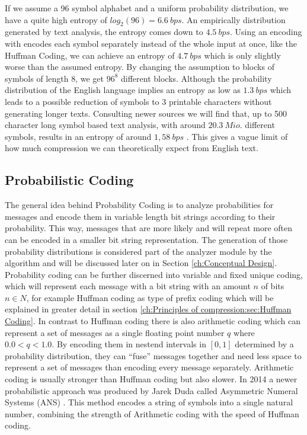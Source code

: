 \par {
If we assume a 96 symbol alphabet and a uniform probability distribution, we have a quite high entropy of $log_2 (96) = 6.6 \: bps$. An empirically distribution generated by text analysis, the entropy comes down to $4.5 \: bps$. Using an encoding with 
encodes each symbol separately instead of the whole input at once, like the Huffman Coding, we can achieve an entropy of $4.7 \: bps$ which is only slightly worse than the assumed entropy. By changing the assumption to blocks of symbols of length 8, we get $96^8$ different blocks. Although the probability distribution of the English language implies an entropy as low as $1.3 \: bps$ which leads to a possible reduction of symbols to 3 printable characters without generating longer texts. Consulting newer sources we will find that, up to 500 character long symbol based text analysis, with around $20.3 \: Mio.$ different symbols, results in an entropy of around $1,58 \: bps$ \cite{entropy-new}. This gives a vague limit of how much compression we can theoretically expect from English text.}


\subsection{Probabilistic Coding}
\par{
The general idea behind Probability Coding is to analyze probabilities for messages and encode them in variable length bit strings according to their probability. This way, messages that are more likely and will repeat more often can be encoded in a smaller bit string representation. The generation of those probability distributions is considered part of the analyzer module by the algorithm and will be discussed later on in Section \ref{ch:Conceptual Design}. Probability coding can be further discerned into variable and fixed unique coding, which will represent each message with a bit string with an amount $n$ of bits $n \in N$, for example Huffman coding as type of prefix coding which will be explained in greater detail in section \ref{ch:Principles of compression:sec:Huffman Coding}. In contrast to Huffman coding there is also arithmetic coding which can represent a set of messages as a single floating point number $q$ where $0.0 < q < 1.0$. By encoding them in nestend intervals in $[0,1]$ determined by a probability distribution, they can \enquote{fuse} messages together and need less space to represent a set of messages than encoding every message separately. Arithmetic coding is usually stronger than Huffman coding but also slower. In 2014 a newer probabilistic approach was produced by Jarek Duda called Asymmetric Numeral Systems (ANS) \cite{DBLP:journals/corr/Duda13}. This method encodes a string of symbols into a single natural number, combining the strength of Arithmetic coding with the speed of Huffman coding.
}

